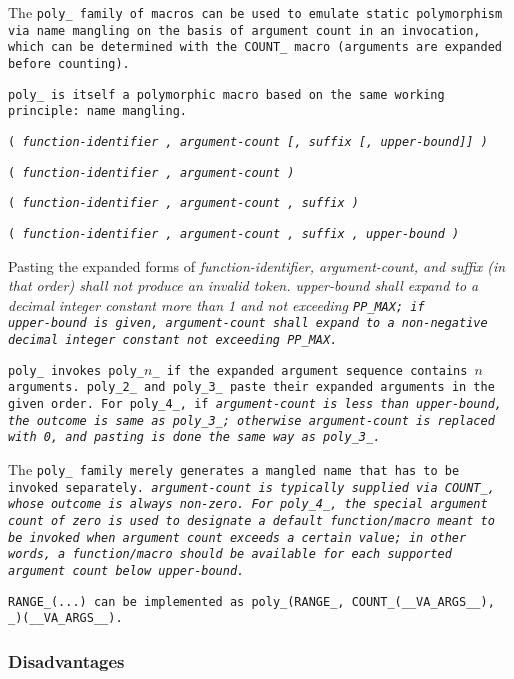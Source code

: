 \def\Subsubsection#1{\subsubsection{#1}}

The \tt{poly_} family of macros can be used to emulate static polymorphism via
name mangling on the basis of argument count in an invocation, which can be
determined with the \tt{COUNT_} macro (arguments are expanded before counting).

\note \tt{poly_} is itself a polymorphic macro
based on the same working principle: name mangling.


\s\s\s\tt{(}
\it{function-identifier}
 \tt{,} \it{argument-count}
[\tt{,} \it{suffix}
[\tt{,} \it{upper-bound}]]
 \tt{)}

\s\tt{(}
\it{function-identifier}
 \tt{,} \it{argument-count}
 \tt{)}

\s\tt{(}
\it{function-identifier}
 \tt{,} \it{argument-count}
\phantom{[}\tt{,} \it{suffix}\phantom{[}
 \tt{)}

\s\tt{(} \it{function-identifier}
 \tt{,} \it{argument-count}
\phantom{[}\tt{,} \it{suffix}
\phantom{[}\tt{,} \it{upper-bound}\phantom{]]}
 \tt{)}


Pasting the expanded forms of \it{function-identifier}, \it{argument-count},
and \it{suffix} (in that order) shall not produce an invalid token.
\it{upper-bound} shall expand to a decimal integer constant more than 1 and not
exceeding \tt{PP_MAX}; if\\\it{upper-bound} is given, \it{argument-count} shall
expand to a non-negative decimal integer constant not exceeding \tt{PP_MAX}.


\tt{poly_} invokes \tt{poly_}$n$\_ if the
expanded argument sequence contains $n$ arguments.
\tt{poly_2_} and \tt{poly_3_} paste their expanded arguments in the given order.
For \tt{poly_4_}, if \it{argument-count} is less than \it{upper-bound},
the outcome is same as \tt{poly_3_}; otherwise \it{argument-count} is
replaced with \tt{0}, and pasting is done the same way as \tt{poly_3_}.

\note The \tt{poly_} family merely generates a
mangled name that has to be invoked separately.
\it{argument-count} is typically supplied via
\tt{COUNT_}, whose outcome is always non-zero.
For \tt{poly_4_}, the special argument count of zero is used to
designate a default function/macro meant to be invoked when argument
count exceeds a certain value; in other words, a function/macro should
be available for each supported argument count below \it{upper-bound}.

\example \tt{RANGE_(...)} can be implemented as
\tt{poly_(RANGE_, COUNT_(__VA_ARGS__), _)(__VA_ARGS__)}.

\Subsubsection{Disadvantages}
